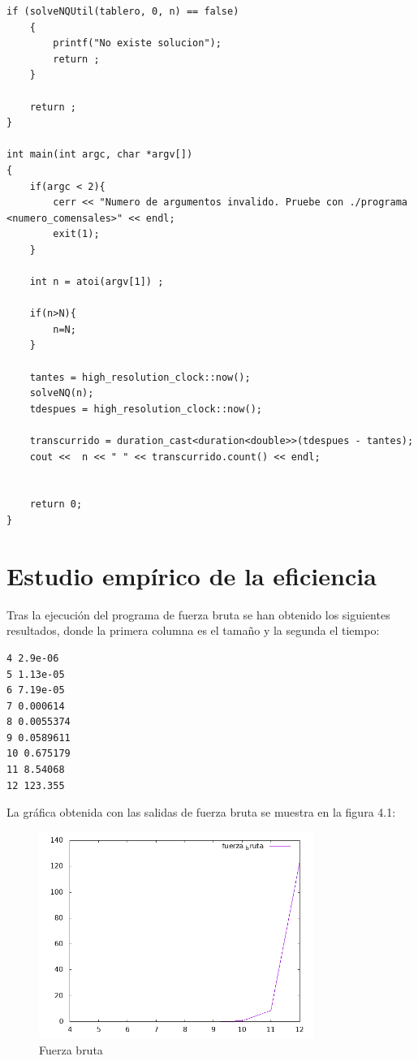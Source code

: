 \begin{lstlisting}[frame=single]
	if (solveNQUtil(tablero, 0, n) == false) 
	{ 
		printf("No existe solucion"); 
		return ; 
	} 

	return ; 
} 

int main(int argc, char *argv[]) 
{ 
	if(argc < 2){
		cerr << "Numero de argumentos invalido. Pruebe con ./programa <numero_comensales>" << endl;
		exit(1);
	}
	
	int n = atoi(argv[1]) ;
	
	if(n>N){
		n=N;
	}
	
	tantes = high_resolution_clock::now();
	solveNQ(n); 
	tdespues = high_resolution_clock::now();
	
	transcurrido = duration_cast<duration<double>>(tdespues - tantes);
	cout <<  n << " " << transcurrido.count() << endl;
	
	
	return 0; 
} 
	\end{lstlisting} 

	\section[Estudio empírico de la eficiencia]{Estudio empírico de la eficiencia}
		
	Tras la ejecución del programa de fuerza bruta se han obtenido los siguientes resultados, donde la primera columna es el tamaño y la segunda el tiempo:\\
	
	\lstset{language=C}
	\begin{lstlisting}[frame=single]
4 2.9e-06
5 1.13e-05
6 7.19e-05
7 0.000614
8 0.0055374
9 0.0589611
10 0.675179
11 8.54068
12 123.355
	\end{lstlisting} 
	
	La gráfica obtenida con las salidas de fuerza bruta se muestra en la figura 4.1: \\
	
	\begin{figure}[htb]
		\centering
		\includegraphics[width=0.8\textwidth]{./imagenes/fuerza_bruta}
		\caption{Fuerza bruta} \label{fig:1}
	\end{figure}
	

